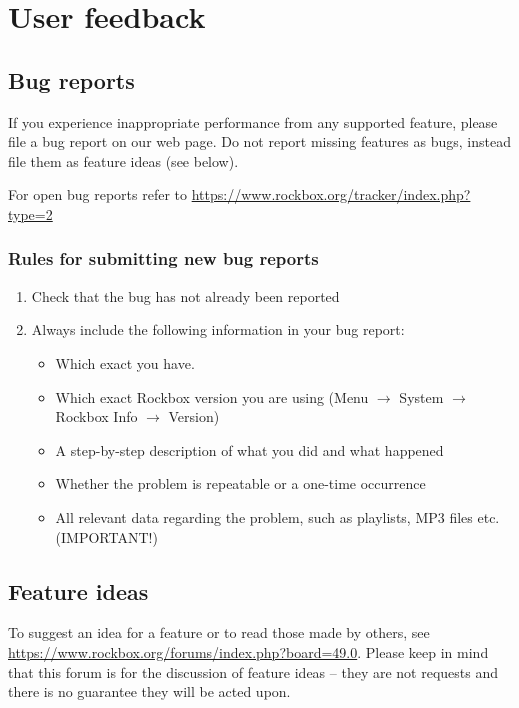 \appendix











\chapter{User feedback}\label{sec:feedback}
\section{Bug reports}
If you experience inappropriate performance from any supported feature,
please file a bug report on our web page. Do not report missing
features as bugs, instead file them as feature ideas (see below).

For open bug reports refer to
\url{https://www.rockbox.org/tracker/index.php?type=2}

\subsection{Rules for submitting new bug reports}

\begin{enumerate}
\item  Check that the bug has not already been reported
\item  Always include the following information in your bug report:

\begin{itemize}
\item  Which exact \dap{} you have.
\item  Which exact Rockbox version you are using
(Menu $\rightarrow$ System $\rightarrow$ Rockbox Info $\rightarrow$ Version)
\item  A step{}-by{}-step description of what you did and what happened
\item  Whether the problem is repeatable or a one{}-time occurrence
\item  All relevant data regarding the problem, such as playlists, MP3
files etc. (IMPORTANT!)
\end{itemize}
\end{enumerate}

\section{Feature ideas}
To suggest an idea for a feature or to read those made by others, see
\url{https://www.rockbox.org/forums/index.php?board=49.0}.  Please keep in
mind that this forum is for the discussion of feature ideas -- they are not
 requests and there is no guarantee they will be acted upon.

